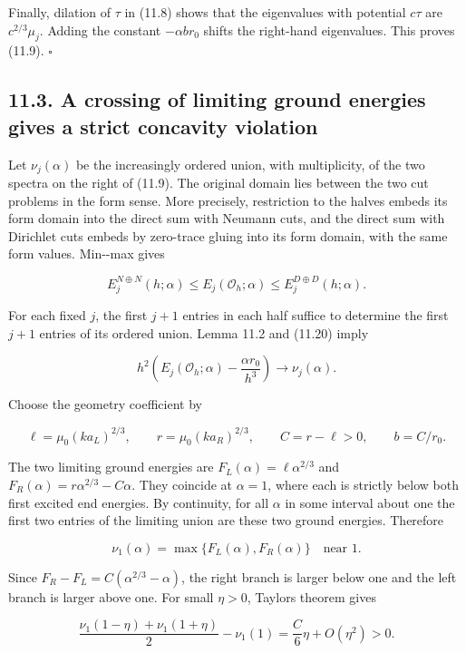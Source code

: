 \documentclass[11pt]{article}
\begin{document}
Finally, dilation of \(\tau\) in (11.8) shows that the eigenvalues with
potential \(c\tau\) are \(c^{2/3}\mu_j\). Adding the constant
\(-\alpha br_0\) shifts the right-hand eigenvalues. This proves (11.9).
\(\square\)

\subsection{11.3. A crossing of limiting ground energies gives a strict
concavity
violation}\label{a-crossing-of-limiting-ground-energies-gives-a-strict-concavity-violation}

Let \(\nu_j(\alpha)\) be the increasingly ordered union, with
multiplicity, of the two spectra on the right of (11.9). The original
domain lies between the two cut problems in the form sense. More
precisely, restriction to the halves embeds its form domain into the
direct sum with Neumann cuts, and the direct sum with Dirichlet cuts
embeds by zero-trace gluing into its form domain, with the same form
values. Min-\/-max gives

\[
E_j^{N\oplus N}(h;\alpha)\le E_j(\mathcal O_h;\alpha)
\le E_j^{D\oplus D}(h;\alpha).
\tag{11.20}
\]

For each fixed \(j\), the first \(j+1\) entries in each half suffice to
determine the first \(j+1\) entries of its ordered union. Lemma 11.2 and
(11.20) imply

\[
h^2\left(E_j(\mathcal O_h;\alpha)-\frac{\alpha r_0}{h^3}\right)
\longrightarrow \nu_j(\alpha).
\tag{11.21}
\]

Choose the geometry coefficient by

\[
\ell=\mu_0(k a_L)^{2/3},\qquad
r=\mu_0(k a_R)^{2/3},\qquad
C=r-\ell>0,\qquad b=C/r_0.
\tag{11.22}
\]

The two limiting ground energies are \(F_L(\alpha)=\ell\alpha^{2/3}\)
and \(F_R(\alpha)=r\alpha^{2/3}-C\alpha\). They coincide at
\(\alpha=1\), where each is strictly below both first excited end
energies. By continuity, for all \(\alpha\) in some interval about one
the first two entries of the limiting union are these two ground
energies. Therefore

\[
\nu_1(\alpha)=\max\{F_L(\alpha),F_R(\alpha)\}
\quad\text{near }1.
\tag{11.23}
\]

Since \(F_R-F_L=C(\alpha^{2/3}-\alpha)\), the right branch is larger
below one and the left branch is larger above one. For small \(\eta>0\),
Taylor\textquotesingle s theorem gives

\[
\frac{\nu_1(1-\eta)+\nu_1(1+\eta)}2-\nu_1(1)
=\frac C6\eta+O(\eta^2)>0.
\tag{11.24}
\]
\end{document}
